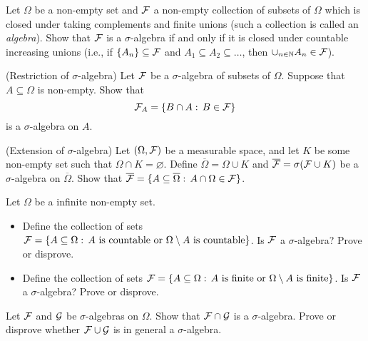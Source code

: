 \begin{problem}
    Let $\Omega$ be a non-empty set and $\mathcal F$ a non-empty collection of subsets of $\Omega$ which is closed under taking complements and finite unions (such a collection is called an \emph{algebra}). Show that $\mathcal F$ is a $\sigma$-algebra if and only if it is closed under countable increasing unions (i.e., if $\{A_n\}\subseteq \mathcal F$ and $A_1\subseteq A_2\subseteq \ldots$, then $\cup_{n\in \mathbb N} A_n \in \mathcal F$).
\end{problem}
        

\begin{problem}(Restriction of $\sigma$-algebra)
    Let $\mathcal F$ be a $\sigma$-algebra of subsets of $\Omega$. Suppose that $A\subseteq \Omega$ is non-empty. Show that
    \begin{equation*}
        \mathcal F_A = \{B\cap A:\, B\in \mathcal F\}
    \end{equation*}
    is a $\sigma$-algebra on $A$.
\end{problem}

\begin{problem}(Extension of $\sigma$-algebra) Let $(\Omega,\mathcal F)$ be a measurable space, and let $K$ be some non-empty set such that $\Omega\cap K = \varnothing$. Define $\overline{\Omega} = \Omega \cup K$ and $\overline{\mathcal F} = \sigma(\mathcal F\cup K)$ be a $\sigma$-algebra on $\overline{\Omega}$. Show that $\overline{\mathcal F} = \{A\subseteq \overline{\Omega}:\, A\cap \Omega\in \mathcal F\}$.
    
\end{problem}

\begin{problem} Let $\Omega$ be a infinite non-empty set. 
    \begin{itemize}
        \item Define the collection of sets $\mathcal F = \{A\subseteq \Omega:\, \text{$A$ is countable or $\Omega\setminus A$ is countable}\}$. Is $\mathcal F$ a $\sigma$-algebra? Prove or disprove.
        \item Define the collection of sets $\mathcal F = \{A\subseteq \Omega:\, \text{$A$ is finite or $\Omega\setminus A$ is finite}\}$. Is $\mathcal F$ a $\sigma$-algebra? Prove or disprove.
    \end{itemize}
\end{problem}

\begin{problem}
    Let $\mathcal F$ and $\mathcal G$ be $\sigma$-algebras on $\Omega$. Show that $\mathcal F\cap\mathcal G$ is a $\sigma$-algebra. Prove or disprove whether $\mathcal F\cup \mathcal G$ is in general a $\sigma$-algebra.
\end{problem}


